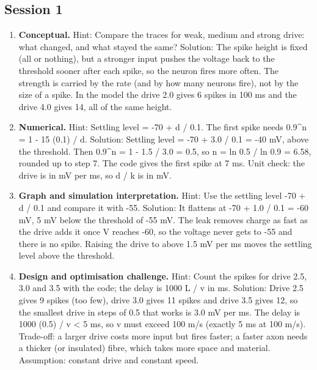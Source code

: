 \documentclass[11pt,a4paper]{article}
\begin{document}
\subsection*{Session 1}
\begin{enumerate}[nosep]
\item \textbf{Conceptual.} Hint: Compare the traces for weak, medium and strong drive: what changed, and what stayed the same? Solution: The spike height is fixed (all or nothing), but a stronger input pushes the voltage back to the threshold sooner after each spike, so the neuron fires more often. The strength is carried by the rate (and by how many neurons fire), not by the size of a spike. In the model the drive 2.0 gives 6 spikes in 100 ms and the drive 4.0 gives 14, all of the same height.
\item \textbf{Numerical.} Hint: Settling level = -70 + d / 0.1. The first spike needs 0.9\textasciicircum{}n = 1 - 15 (0.1) / d. Solution: Settling level = -70 + 3.0 / 0.1 = -40 mV, above the threshold. Then 0.9\textasciicircum{}n = 1 - 1.5 / 3.0 = 0.5, so n = ln 0.5 / ln 0.9 = 6.58, rounded up to step 7. The code gives the first spike at 7 ms. Unit check: the drive is in mV per ms, so d / k is in mV.
\item \textbf{Graph and simulation interpretation.} Hint: Use the settling level -70 + d / 0.1 and compare it with -55. Solution: It flattens at -70 + 1.0 / 0.1 = -60 mV, 5 mV below the threshold of -55 mV. The leak removes charge as fast as the drive adds it once V reaches -60, so the voltage never gets to -55 and there is no spike. Raising the drive to above 1.5 mV per ms moves the settling level above the threshold.
\item \textbf{Design and optimisation challenge.} Hint: Count the spikes for drive 2.5, 3.0 and 3.5 with the code; the delay is 1000 L / v in ms. Solution: Drive 2.5 gives 9 spikes (too few), drive 3.0 gives 11 spikes and drive 3.5 gives 12, so the smallest drive in steps of 0.5 that works is 3.0 mV per ms. The delay is 1000 (0.5) / v \textless{} 5 ms, so v must exceed 100 m/s (exactly 5 ms at 100 m/s). Trade-off: a larger drive costs more input but fires faster; a faster axon needs a thicker (or insulated) fibre, which takes more space and material. Assumption: constant drive and constant speed.
\end{enumerate}
\end{document}
